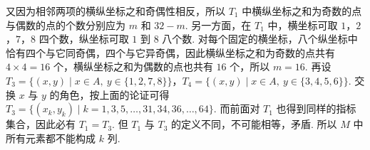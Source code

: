 \documentclass[UTF8,a4paper,oneside,11pt]{ctexbook}
\begin{document}
\begin{solution}
\begin{enumerate}
又因为相邻两项的横纵坐标之和奇偶性相反，所以 \(T_1\) 中横纵坐标之和为奇数的点与偶数的点的个数分别应为 \(m\) 和 \(32-m\). 另一方面，在 \(T_1\) 中，横坐标可取 \(1\)，\(2\)，\(7\)，\(8\) 四个数，纵坐标可取 \(1\) 到 \(8\) 八个数. 对每个固定的横坐标，八个纵坐标中恰有四个与它同奇偶，四个与它异奇偶，因此横纵坐标之和为奇数的点共有 \(4\times 4=16\) 个，横纵坐标之和为偶数的点也共有 \(16\) 个，所以 \(m=16\). 再设
\(T_3=\{(x,y)\mid x\in A,\ y\in\{1,2,7,8\}\}\)，\(T_4=\{(x,y)\mid x\in A,\ y\in\{3,4,5,6\}\}\). 交换 \(x\) 与 \(y\) 的角色，按上面的论证可得 \(T_3=\{(x_k,y_k)\mid k=1,3,5,\dots,31,34,36,\dots,64\}\). 而前面对 \(T_1\) 也得到同样的指标集合，因此必有 \(T_1=T_3\). 但 \(T_1\) 与 \(T_3\) 的定义不同，不可能相等，矛盾. 所以 \(M\) 中所有元素都不能构成 \(k\) 列.
\end{enumerate}
\end{solution}

\end{document}
